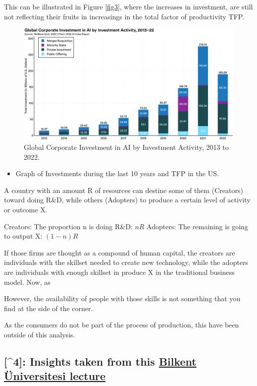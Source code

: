 \documentclass[preprint, 3p,
authoryear]{elsarticle} %
\providecommand{\tightlist}{%
  \setlength{\itemsep}{0pt}\setlength{\parskip}{0pt}}
\begin{document}
This can be illustrated in Figure \ref{fig3}, where the increases in
investment, are still not reflecting their fruits in increasings in the
total factor of productivity TFP.

\begin{figure}

{\centering \includegraphics[width=0.7\linewidth]{../Views/global_investiment_by_inv_activity} 

}

\caption{\label{fig3}Global Corporate Investment in AI by Investment Activity, 2013 to 2022.}\label{fig:fig3}
\end{figure}

\begin{itemize}
\tightlist
\item
  Graph of Investments during the last 10 years and TFP in the US.
\end{itemize}

A country with an amount R of resources can destine some of them
(Creators) toward doing R\&D, while others (Adopters) to produce a
certain level of activity or outcome X.

Creators: The proportion n is doing R\&D: \(nR\) Adopters: The remaining
is going to output X: \((1-n)R\)

If those firms are thought as a compound of human capital, the creators
are individuals with the skillset needed to create new technology, while
the adopters are individuals with enough skillset in produce X in the
traditional business model. Now, as

However, the availability of people with those skills is not something
that you find at the side of the corner.

As the consumers do not be part of the process of production, this have
been outside of this analysis.

\hypertarget{insights-taken-from-this-bilkent-uxfcniversitesi-lecture}{%
\subsection{\texorpdfstring{{[}\^{}4{]}: Insights taken from this
\href{https://youtu.be/m3nkTrFF2zs?si=dgPJlvVgQuuQAcL8}{Bilkent
Üniversitesi
lecture}}{{[}\^{}4{]}: Insights taken from this Bilkent Üniversitesi lecture}}\label{insights-taken-from-this-bilkent-uxfcniversitesi-lecture}}
\end{document}
